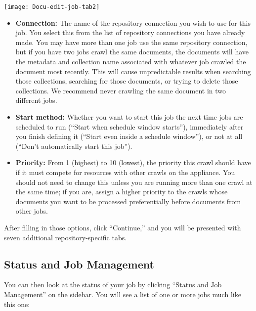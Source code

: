 \begin{changemargin}{1.5in}{0in}
\begin{itemize}
\end{itemize}

\texttt{[image: Docu-edit-job-tab2]}

\begin{itemize}

\item \textbf{Connection:} The name of the repository connection you
wish to use for this job. You select this from the list of repository
connections you have already made. You may have more than one job use
the same repository connection, but if you have two jobs crawl the same
documents, the documents will have the metadata and collection name
associated with whatever job crawled the document most recently. This
will cause unpredictable results when searching those collections,
searching for those documents, or trying to delete those collections.
We recommend never crawling the same document in two different jobs.

\item \textbf{Start method:} Whether you want to start this job the next
time jobs are scheduled to run (``Start when schedule window starts''),
immediately after you finish defining it (``Start even inside a schedule
window''), or not at all (``Don't automatically start this job'').

\item \textbf{Priority:} From 1 (highest) to 10 (lowest), the priority
this crawl should have if it must compete for resources with other
crawls on the appliance. You should not need to change this unless you
are running more than one crawl at the same time; if you are, assign a
higher priority to the crawls whose documents you want to be processed
preferentially before documents from other jobs.

\end{itemize}

After filling in those options, click ``Continue,'' and you will be
presented with seven additional repository-specific tabs. 



\subsection{\label{ManageJobs}Status and Job Management}

You can then look at the status of your job by clicking ``Status and 
Job Management'' on the sidebar. You will see a list of one or more jobs
much like this one:


\end{changemargin}
